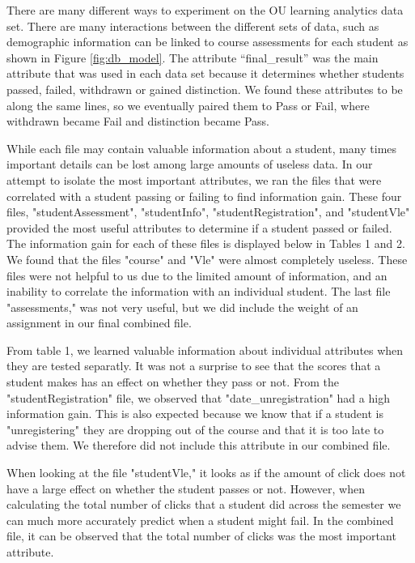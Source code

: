 \documentclass[12pt]{article}
\begin{document}
There are many different ways to experiment on the OU learning analytics data set. There are many interactions between the different sets of data, such as demographic
information can be linked to course assessments for each student as shown in Figure \ref{fig:db_model}. The attribute ``final\_result'' was the main attribute that was used in each data set because it determines whether students passed, failed, withdrawn or gained distinction. We found these attributes to be along the same lines, so we eventually paired them to Pass or Fail, where withdrawn became Fail and distinction became Pass.
 
 While each file may contain valuable information about a student, many times important details can be lost among large amounts of useless data. In our attempt to isolate the most important attributes, we ran the files that were correlated with a student passing or failing to find information gain. These four files, "studentAssessment", "studentInfo", "studentRegistration", and "studentVle" provided the most useful attributes to determine if a student passed or failed. The information gain for each of these files is displayed below in Tables 1 and 2. We found that the files "course" and "Vle" were almost completely useless. These files were not helpful to us due to the limited amount of information, and an inability to correlate the information with an individual student.  The last file "assessments," was not very useful, but we did include the weight of an assignment in our final combined file.
 
 From table 1, we learned valuable information about individual attributes when they are tested separatly. It was not a surprise to see that the scores that a student makes has an effect on whether they pass or not. From the "studentRegistration" file, we observed that "date\_unregistration" had a high information gain. This is also expected because we know that if a student is "unregistering" they are dropping out of the course and that it is too late to advise them. We therefore did not include this attribute in our combined file.
 
 When looking at the file "studentVle," it looks as if the amount of click does not have a large effect on whether the student passes or not. However, when calculating the total number of clicks that a student did across the semester we can much more accurately predict when a student might fail. In the combined file, it can be observed that the total number of clicks was the most important attribute.
 
\end{document}
